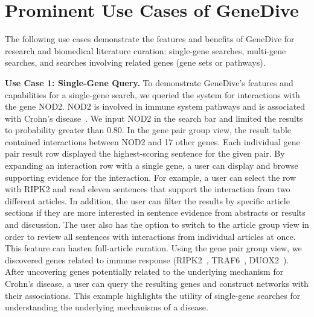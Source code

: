 \documentclass{ws-procs11x85}
\begin{document}
\section{Prominent Use Cases of GeneDive}
\label{sec:usecases}

The following use cases demonstrate the features and benefits of GeneDive for research and biomedical literature curation: single-gene searches, multi-gene searches, and searches involving related genes (gene sets or pathways). \newline

\noindent \textbf{Use Case 1: Single-Gene Query.}  To demonstrate GeneDive's features and capabilities for a single-gene search, we queried the system for interactions with the gene NOD2. NOD2 is involved in immune system pathways and is associated with Crohn's disease~\cite{Yamamoto2009}.  We input NOD2 in the search bar and limited the results to probability greater than 0.80. In the gene pair group view, the result table contained interactions between NOD2 and 17 other genes. Each individual gene pair result row displayed the highest-scoring sentence for the given pair. By expanding an interaction row with a single gene, a user can display and browse supporting evidence for the interaction. For example, a user can select the row with RIPK2 and read eleven sentences that support the interaction from two different articles. In addition, the user can filter the results by specific article sections if they are more interested in sentence evidence from abstracts or results and discussion. The user also has the option to switch to the article group view in order to review all sentences with interactions from individual articles at once. This feature can hasten full-article curation. Using the gene pair group view, we discovered genes related to immune response (RIPK2~\cite{Ruefli2004}, TRAF6~\cite{Manna2005}, DUOX2~\cite{Joo2012}). After uncovering genes potentially related to the underlying mechanism for Crohn's disease, a user can query the resulting genes and construct networks with their associations. This example highlights the utility of single-gene searches for understanding the underlying mechanisms of a disease. \newline
\end{document}

